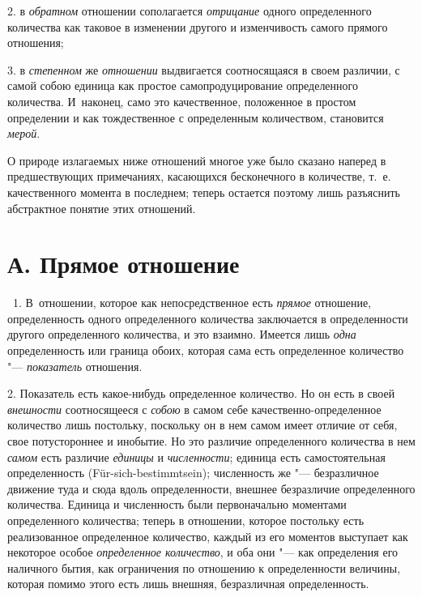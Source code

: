 2. в {\em обратном} отношении сополагается
{\em отрицание} одного определенного количества как
таковое в изменении другого и изменчивость самого прямого отношения;

3. в {\em степенном} же
{\em отношении} выдвигается соотносящаяся в своем
различии, с самой собою единица как простое самопродуцирование
определенного количества. И~наконец, само это качественное, положенное в
простом определении и как тождественное с определенным количеством,
становится {\em мерой}.

О природе излагаемых ниже отношений многое уже было сказано наперед в
предшествующих примечаниях, касающихся бесконечного в количестве, т.~е.
качественного момента в последнем; теперь остается поэтому лишь разъяснить
абстрактное понятие этих отношений.

\section[А. Прямое отношение]{А. Прямое отношение}
\ 1. В~отношении, которое как непосредственное есть
{\em прямое} отношение, определенность одного
определенного количества заключается в определенности другого определенного
количества, и это взаимно. Имеется лишь {\em одна}
определенность или граница обоих, которая сама есть определенное количество
"--- {\em показатель} отношения.

2. Показатель есть какое-нибудь определенное количество. Но он есть в своей
{\em внешности} соотносящееся с
{\em собою} в самом себе качественно-определенное
количество лишь постольку, поскольку он в нем самом имеет отличие от себя,
свое потустороннее и инобытие. Но это различие определенного количества в
нем {\em самом} есть различие
{\em единицы} и {\em численности};
единица есть самостоятельная определенность (Für-sich-bestimmtsein);
численность же "--- безразличное движение туда и сюда вдоль определенности,
внешнее безразличие определенного количества. Единица и численность были
первоначально моментами определенного количества; теперь в отношении,
которое постольку есть реализованное определенное количество, каждый из его
моментов выступает как некоторое особое
{\em определенное количество}, и оба они "--- как
определения его наличного бытия, как ограничения по отношению к
определенности величины, которая помимо этого есть лишь внешняя,
безразличная определенность.

